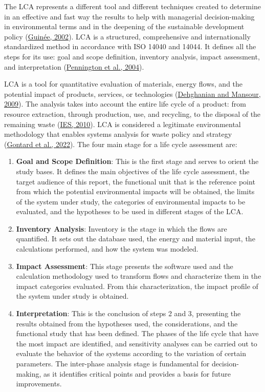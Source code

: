 \documentclass[12pt]{elsarticle} %
\begin{document}
The LCA represents a different tool and different techniques created to determine in an effective and fast way the results to help with managerial decision-making in environmental terms and in the deepening of the sustainable development policy (\protect\hyperlink{ref-guinee2002}{Guinée, 2002}).
LCA is a structured, comprehensive and internationally standardized method in accordance with ISO 14040 and 14044. It defines all the steps for its use: goal and scope definition, inventory analysis, impact assessment, and interpretation (\protect\hyperlink{ref-pennington2004}{Pennington et al., 2004}).

LCA is a tool for quantitative evaluation of materials, energy flows, and the potential impact of products, services, or technologies (\protect\hyperlink{ref-dehghanian2009}{Dehghanian and Mansour, 2009}).
The analysis takes into account the entire life cycle of a product: from resource extraction, through production, use, and recycling, to the disposal of the remaining waste (\protect\hyperlink{ref-ILCD2011}{IES, 2010}).
LCA is considered a legitimate environmental methodology that enables systems analysis for waste policy and strategy (\protect\hyperlink{ref-gontard2022}{Gontard et al., 2022}).
The four main stage for a life cycle assessment are:

\begin{enumerate}
\def\labelenumi{\arabic{enumi}.}
\item
  \textbf{Goal and Scope Definition}: This is the first stage and serves to orient the study bases. It defines the main objectives of the life cycle assessment, the target audience of this report, the functional unit that is the reference point from which the potential environmental impacts will be obtained, the limits of the system under study, the categories of environmental impacts to be evaluated, and the hypotheses to be used in different stages of the LCA.
\item
  \textbf{Inventory Analysis}: Inventory is the stage in which the flows are quantified. It sets out the database used, the energy and material input, the calculations performed, and how the system was modeled.
\item
  \textbf{Impact Assessment}: This stage presents the software used and the calculation methodology used to transform flows and characterize them in the impact categories evaluated. From this characterization, the impact profile of the system under study is obtained.
\item
  \textbf{Interpretation}: This is the conclusion of steps 2 and 3, presenting the results obtained from the hypotheses used, the considerations, and the functional study that has been defined. The phases of the life cycle that have the most impact are identified, and sensitivity analyses can be carried out to evaluate the behavior of the systems according to the variation of certain parameters. The inter-phase analysis stage is fundamental for decision-making, as it identifies critical points and provides a basis for future improvements.
\end{enumerate}
\end{document}
